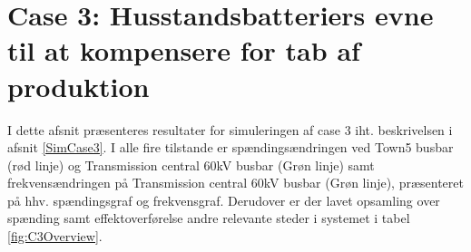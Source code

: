 
\section{Case 3: Husstandsbatteriers evne til at kompensere for tab af produktion}
I dette afsnit præsenteres resultater for simuleringen af case 3 iht. beskrivelsen i afsnit \ref{SimCase3}. I alle fire tilstande er spændingsændringen ved Town5 busbar (rød linje) og Transmission central 60kV busbar (Grøn linje) samt frekvensændringen på Transmission central 60kV busbar (Grøn linje), præsenteret på hhv. spændingsgraf og frekvensgraf. Derudover er der lavet opsamling over spænding samt effektoverførelse andre relevante steder i systemet i tabel \ref{fig:C3Overview}. \\ \\

